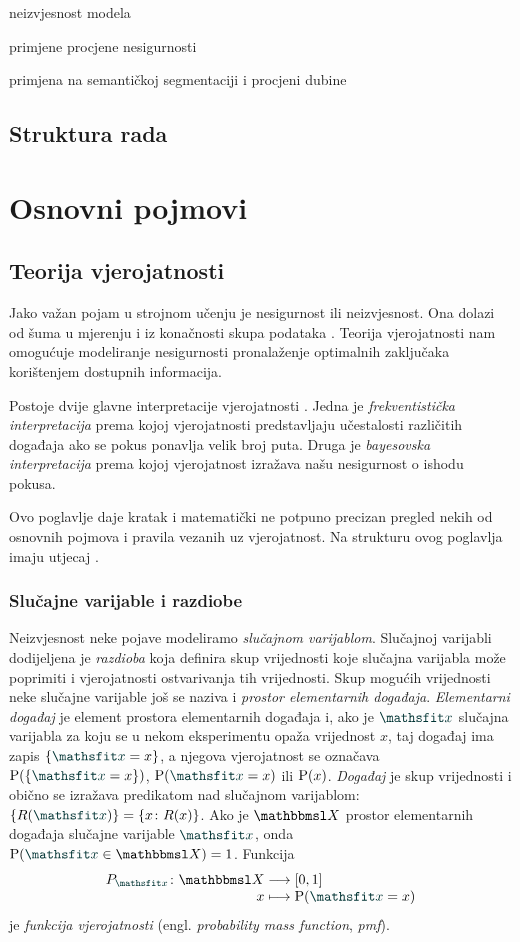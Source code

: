 \documentclass[utf8, diplomski, lmodern]{fer}
\begin{document}
neizvjesnost modela

primjene procjene nesigurnosti

primjena na semantičkoj segmentaciji i procjeni dubine


\section{Struktura rada}



\chapter{Osnovni pojmovi}


\section{Teorija vjerojatnosti}

Jako važan pojam u strojnom učenju je nesigurnost ili neizvjesnost. Ona dolazi od šuma u mjerenju i iz konačnosti skupa podataka \citep{Bishop:2006:PRML}. Teorija vjerojatnosti nam omogućuje modeliranje nesigurnosti pronalaženje optimalnih zaključaka korištenjem dostupnih informacija.

Postoje dvije glavne interpretacije vjerojatnosti \citep{Murphy:2012:MLPP}. Jedna je \emph{frekventistička interpretacija} prema kojoj vjerojatnosti predstavljaju učestalosti različitih događaja ako se pokus ponavlja velik broj puta. Druga je \emph{bayesovska interpretacija} prema kojoj vjerojatnost izražava našu nesigurnost o ishodu pokusa. 
 
Ovo poglavlje daje kratak i matematički ne potpuno precizan pregled nekih od osnovnih pojmova i pravila vezanih uz vjerojatnost. Na strukturu ovog poglavlja imaju utjecaj \citet{Goodfellow:2016:DL,Murphy:2012:MLPP}.

\subsection{Slučajne varijable i razdiobe}

Neizvjesnost neke pojave modeliramo \emph{slučajnom varijablom}. Slučajnoj varijabli dodijeljena je \emph{razdioba} koja definira skup vrijednosti koje slučajna varijabla može poprimiti i vjerojatnosti ostvarivanja tih vrijednosti. Skup mogućih vrijednosti neke slučajne varijable još se naziva i \emph{prostor elementarnih događaja}. \emph{Elementarni događaj} je element prostora elementarnih događaja i, ako je $\rvar x$ slučajna varijabla za koju se u nekom eksperimentu opaža vrijednost $x$, taj događaj ima zapis $\cbr{\rvar x = x}$, a njegova vjerojatnost se označava $\P(\cbr{\rvar x = x})$, $\P(\rvar x = x)$ ili $\P(x)$. \emph{Događaj} je skup vrijednosti i obično se izražava predikatom nad slučajnom varijablom: $\cbr{R(\rvar x)}=\cbr{x\colon R(x)}$. Ako je $\set X$ prostor elementarnih događaja slučajne varijable $\rvar x$, onda $\P(\rvar x\in \set X)=1$. Funkcija 
\begin{align*}
\fullfunction{P_{\rvar x}}{\set X}{\intcc{0,1}}{x}{\P(\rvar x=x)}
\end{align*}
je \emph{funkcija vjerojatnosti} (engl. \textit{probability mass function}, \textit{pmf}).
\end{document}
